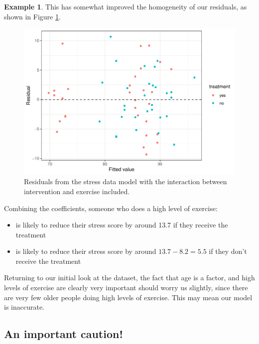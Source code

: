 \documentclass[
  openany]{book}
\providecommand{\tightlist}{%
  \setlength{\itemsep}{0pt}\setlength{\parskip}{0pt}}
\theoremstyle{definition}
\theoremstyle{definition}
\newtheorem{example}{Example}[chapter]
\theoremstyle{definition}
\theoremstyle{definition}
\theoremstyle{remark}
\begin{document}
\begin{example}
This has somewhat improved the homogeneity of our residuals, as shown in Figure \ref{fig:lmstressresid2}.

\begin{figure}
\centering
\includegraphics{CT4H_notes_files/figure-latex/lmstressresid2-1.pdf}
\caption{\label{fig:lmstressresid2}Residuals from the stress data model with the interaction between intervention and exercise included.}
\end{figure}

Combining the coefficients, someone who does a high level of exercise:

\begin{itemize}
\tightlist
\item
  is likely to reduce their stress score by around 13.7 if they receive the treatment
\item
  is likely to reduce their stress score by around \(13.7 - 8.2 = 5.5\) if they don't receive the treatment
\end{itemize}

Returning to our initial look at the dataset, the fact that age is a factor, and high levels of exercise are clearly very important should worry us slightly, since there are very few older people doing high levels of exercise. This may mean our model is inaccurate.
\end{example}

\subsection*{An important caution!}\label{an-important-caution}
\end{document}
